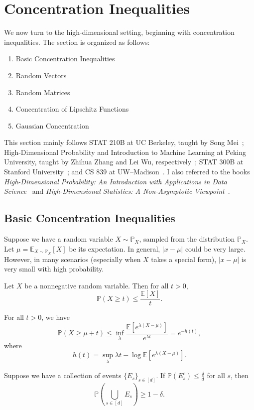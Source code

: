 \newpage
\section{Concentration Inequalities}
We now turn to the high-dimensional setting, beginning with concentration inequalities. The section is organized as follows:
\begin{enumerate}
    \item Basic Concentration Inequalities
    \item Random Vectors 
    \item Random Matrices
    \item Concentration of Lipschitz Functions
    \item Gaussian Concentration
\end{enumerate}

This section mainly follows STAT 210B at UC Berkeley, taught by Song Mei~\cite{meiBerkeleyStat210B}; High-Dimensional Probability and Introduction to Machine Learning at Peking University, taught by Zhihua Zhang and Lei Wu, respectively~\cite{zhangPkuHighDimensionalProbability,wuPkuIntroductionMachineLearning}; STAT 300B at Stanford University~\cite{duchiStanfordStats300B}; and CS 839 at UW--Madison~\cite{chenWisconsinCs839}. I also referred to the books \emph{High-Dimensional Probability: An Introduction with Applications in Data Science}~\cite{vershynin2018high} and \emph{High-Dimensional Statistics: A Non-Asymptotic Viewpoint}~\cite{wainwright2019high}.

\subsection{Basic Concentration Inequalities}
Suppose we have a random variable $X \sim \mathbb{P}_X$, sampled from the distribution $\mathbb{P}_X$. Let $\mu = \mathbb{E}_{X \sim \mathbb{P}_X}[X]$ be its expectation. In general, $|x - \mu|$ could be very large. However, in many scenarios (especially when $X$ takes a special form), $|x - \mu|$ is very small with high probability.

\begin{lem}
Let $X$ be a nonnegative random variable. Then for all $t > 0$,
\[
\mathbb{P}(X \geq t) \leq \frac{\mathbb{E}[X]}{t}.
\]
\end{lem}

\begin{lem}
For all $t > 0$, we have
\[
\mathbb{P}(X \geq \mu + t) \leq \inf_{\lambda} \frac{\mathbb{E}[e^{\lambda(X-\mu)}]}{e^{\lambda t}} = e^{-h(t)},
\]
where
\[
h(t) = \sup_{\lambda} \lambda t - \log \mathbb{E}[e^{\lambda(X-\mu)}].
\]
\end{lem}
\begin{lem}
Suppose we have a collection of events $\{E_s\}_{s \in [d]}$. If $\mathbb{P}(E_s^c) \leq \frac{\delta}{d}$ for all $s$, then
\[
\mathbb{P}\!\left( \bigcup_{s \in [d]} E_s \right) \geq 1 - \delta.
\]
\end{lem}

